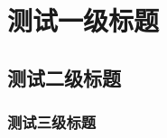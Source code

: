 \documentclass[twoside,maketable]{cauthesis}
\begin{document}
\section{测试一级标题}
	\subsection{测试二级标题}
		\subsubsection{测试三级标题}

			\printbibliography%
\end{document}
